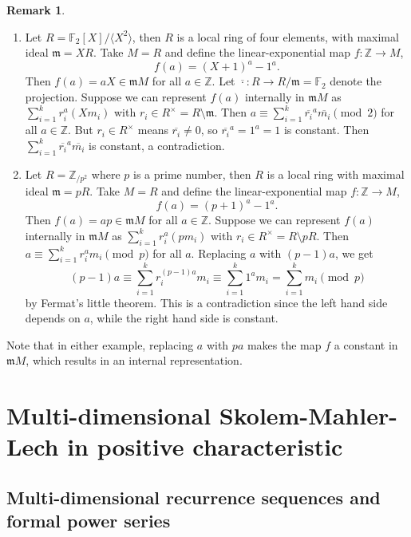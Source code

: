 \documentclass[letterpaper, 11pt, thm-restate]{article}
\numberwithin{equation}{section}
\newcommand{\Z}{\mathbb{Z}}
\newcommand{\F}{\mathbb{F}}
\newcommand{\gen}[1]{\langle {#1} \rangle}
\newcommand{\frm}{\mathfrak{m}}
\theoremstyle{definition}
\theoremstyle{definition}
\theoremstyle{definition}
\newtheorem{remark}[theorem]{Remark}
\begin{document}
\begin{remark}
    \begin{enumerate}[nosep, label=(\arabic*)]
        \item Let $R = \F_2[X]/\gen{X^2}$, then $R$ is a local ring of four elements, with maximal ideal $\frm=XR$.
        Take $M = R$ and define the linear-exponential map $f \colon \Z \rightarrow M$, 
        \[
        f(a) = (X+1)^a- 1^a.
        \]
        Then $f(a) = aX \in \frm M$ for all $a \in \Z$.
        Let $\overline{\cdot} \colon R \rightarrow R/\frm = \F_2$ denote the projection.
        Suppose we can represent $f(a)$ internally in $\frm M$ as $\sum_{i = 1}^k r_i^a (Xm_i)$ with $r_i \in R^{\times} = R \setminus \frm$.
        Then $a \equiv \sum_{i = 1}^k \overline{r_i}^a \overline{m_i} \pmod{2}$ for all $a\in\Z$. 
        But $r_i \in R^{\times}$ means $\overline{r_i} \neq 0$, so $\overline{r_i}^a  = 1^a = 1$ is constant.
        Then $\sum_{i = 1}^k \overline{r_i}^a \overline{m_i}$ is constant, a contradiction.
        \item Let $R = \Z_{/p^2}$ where $p$ is a prime number, then $R$ is a local ring with maximal ideal $\frm=pR$.
        Take $M = R$ and define the linear-exponential map $f \colon \Z \rightarrow M$, 
        \[
        f(a) = (p+1)^a- 1^a.
        \]
        Then $f(a) = ap \in \frm M$ for all $a \in \Z$.
        Suppose we can represent $f(a)$ internally in $\frm M$ as $\sum_{i = 1}^k r_i^a (pm_i)$ with $r_i \in R^{\times} = R \setminus pR$.
        Then $a \equiv \sum_{i = 1}^k r_i^a m_i \pmod{p}$ for all $a$.
        Replacing $a$ with $(p-1)a$, we get 
        \[
        (p-1)a \equiv \sum_{i = 1}^k r_i^{(p-1)a} m_i \equiv \sum_{i = 1}^k 1^{a} m_i = \sum_{i = 1}^k m_i \pmod{p}
        \]
        by Fermat's little theorem.
        This is a contradiction since the left hand side depends on $a$, while the right hand side is constant.
    \end{enumerate}
    \smallskip
    Note that in either example, replacing $a$ with $pa$ makes the map $f$ a constant in $\frm M$, which results in an internal representation.
\end{remark}

\section{Multi-dimensional Skolem-Mahler-Lech in positive characteristic}\label{sec:multi_dim}

\subsection{Multi-dimensional recurrence sequences and formal power series}\label{subsec:def_LRS}
\end{document}
